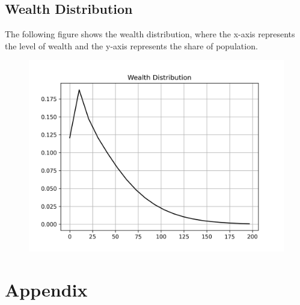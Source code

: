 \documentclass[]{article}
\begin{document}
\subsection{Wealth Distribution}
The following figure shows the wealth distribution, where the x-axis represents the level of wealth and the y-axis represents the share of population.
\begin{figure}[H]
	\centering
	\includegraphics{Figures/Figure_WealthDistribution}
	\label{figure:1}
\end{figure}
\newpage 

\section{Appendix}{\label{Appendix}}
	
\newpage 



\end{document}

